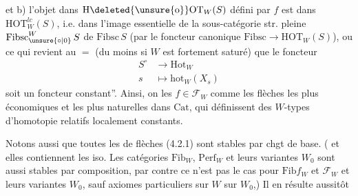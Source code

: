 et \quad b) l'objet dans $\mathrm{H}\deleted{\unsure{\mathrm o}}\mathrm{OT}_W(S)$ défini par $f$ est
dans $\mathrm{HOT}^{lc}_W(S)$, i.e. dans l'image essentielle
de la sous-catégorie str. pleine $\mathrm{Fibsc}^{W}_{\unsure{\circ|0}}\,S$ de
$\mathrm{Fibsc}\,S$ (par le foncteur canonique 
$\mathrm{Fibsc}\longrightarrow\mathrm{HOT}_W(S)$), ou ce qui revient au
$=$ (du moins si $W$ est fortement saturé)
que le foncteur
\[
\begin{aligned}
S^{\circ}&\longrightarrow\mathrm{Hot}_W\\
s&\longmapsto\mathrm{hot}_W(X_s)
\end{aligned}
\]
soit  un foncteur  constant''. Ainsi,
on  les $f\in\mathcal F_W$ comme les
flèches les plus économiques et les plus
naturelles dans $\mathrm{Cat}$, qui définissent des
$W$-types d'homotopie relatifs localement constants.

Notons aussi que toutes les   de
flèches (4.2.1) sont stables par chgt de base.
( et elles contiennent les iso\unsure{)}. Les catégories
$\mathrm{Fib}_W$, $\mathrm{Perf}_W$ et leurs variantes $W_0$ sont aussi
stables par composition, par contre ce n'est
pas le cas pour $\mathrm{Fib}f_W$ et $\mathcal F_W$ et leurs
variantes $W_0$, sauf axiomes particuliers sur
$W$  sur $W_0$,) Il en résulte aussitôt
